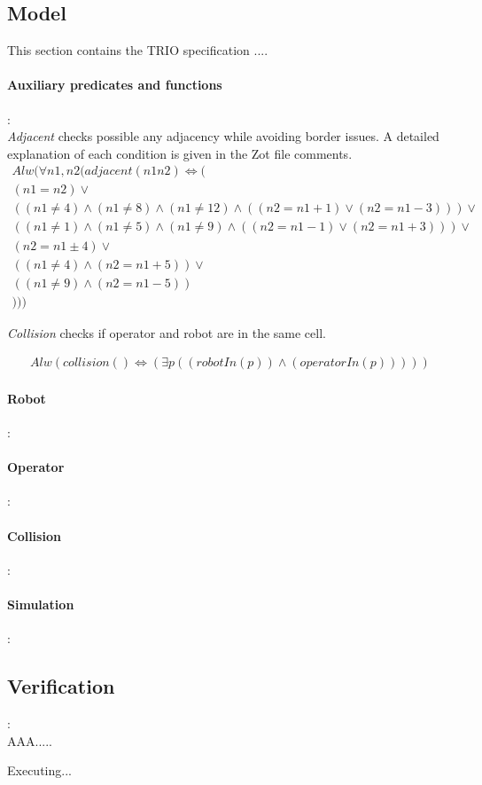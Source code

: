 \subsection{Model}
This section contains the TRIO specification ....

\paragraph{Auxiliary predicates and functions}:\\

\textit{Adjacent} checks possible any adjacency while avoiding border issues. A detailed explanation of each condition is given in the Zot file comments.
\begin{align*}
	Alw(\forall n1,n2 (adjacent(n1 n2)\iff (\\
	(n1 = n2) \lor \\
	((n1 \neq 4)\land(n1 \neq 8)\land(n1 \neq 12)\land((n2=n1+1)\lor(n2=n1-3)))\lor \\
	((n1 \neq 1)\land(n1 \neq 5)\land(n1 \neq 9)\land((n2=n1-1)\lor(n2=n1+3)))\lor \\
	(n2 = n1\pm 4) \lor \\
	((n1 \neq 4)\land(n2 = n1+ 5)) \lor \\
	((n1 \neq 9)\land(n2 = n1- 5))  \\
	)))
\end{align*}

\textit{Collision} checks if operator and robot are in the same cell.

\begin{align*}
	Alw(collision()\iff (\exists p(
	(robotIn(p)) \land 
	(operatorIn(p)) 
	)))
\end{align*}


\paragraph{Robot}:\\


\paragraph{Operator}:\\

\paragraph{Collision}:\\

\paragraph{Simulation}:\\

\subsection{Verification}:\\
AAA.....
\vspace{10mm}

Executing...